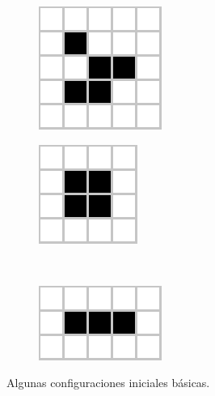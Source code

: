 \documentclass[../proyecto.tex]{book}
\begin{document}
\begin{figure}[H]
	\centering
	\begin{subfigure}[b]{0.3\linewidth} 
        \centering
        \includegraphics[height=.6\linewidth]{./images/glider.png}
        \caption{}
        \label{fig:1-1}
    \end{subfigure}
    \quad
	\begin{subfigure}[b]{0.3\linewidth} 
        \centering
        \includegraphics[height=.55\linewidth]{./images/block.png}
        \caption{}
        \label{fig:1-2}
    \end{subfigure}
	\\    
    \begin{subfigure}[b]{0.3\linewidth} 
        \centering
        \includegraphics[height=0.45\linewidth]{./images/blinker.png}
        \caption{}
        \label{fig:1-3}
    \end{subfigure}
	\caption{Algunas configuraciones iniciales básicas.}
	\label{fig:congIniciales}
\end{figure} 
\end{document}
